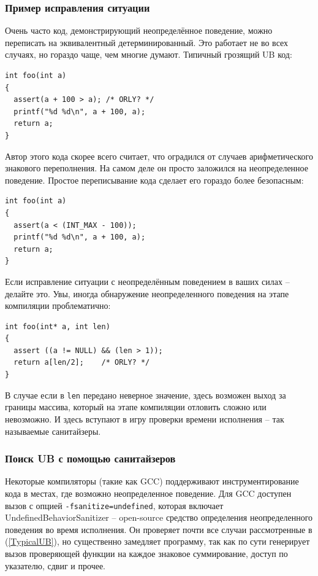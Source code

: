 \documentclass[a4paper,12pt,oneside]{article}
\begin{document}
\subsubsection{Пример исправления ситуации}\label{CorrectingUB}

Очень часто код, демонстрирующий неопределённое поведение, можно переписать на эквивалентный детерминированный. Это работает не во всех случаях, но гораздо чаще, чем многие думают. Типичный грозящий UB код:

\begin{lstlisting}
int foo(int a) 
{
  assert(a + 100 > a); /* ORLY? */
  printf("%d %d\n", a + 100, a);
  return a;
}
\end{lstlisting}

Автор этого кода скорее всего считает, что оградился от случаев арифметического знакового переполнения. На самом деле он просто заложился на неопределенное поведение. Простое переписывание кода сделает его гораздо более безопасным:

\begin{lstlisting}
int foo(int a) 
{
  assert(a < (INT_MAX - 100));
  printf("%d %d\n", a + 100, a);
  return a;
}
\end{lstlisting}

Если исправление ситуации с неопределённым поведением в ваших силах -- делайте это. Увы, иногда обнаружение неопределенного поведения на этапе компиляции проблематично:

\begin{lstlisting}
int foo(int* a, int len) 
{
  assert ((a != NULL) && (len > 1));
  return a[len/2];    /* ORLY? */
}
\end{lstlisting}

В случае если в \lstinline!len! передано неверное значение, здесь возможен выход за границы массива, который на этапе компиляции отловить сложно или невозможно. И здесь вступают в игру проверки времени исполнения -- так называемые санитайзеры.

\subsubsection{Поиск UB с помощью санитайзеров}\label{SanitizerUsage}

Некоторые компиляторы (такие как GCC) поддерживают инструментирование кода в местах, где возможно неопределенное поведение. Для GCC доступен вызов с опцией \lstinline!-fsanitize=undefined!, которая включает UndefinedBehaviorSanitizer -- open-source средство определения неопределенного поведения во время исполнения. Он проверяет почти все случаи рассмотренные в (\ref{TypicalUB}), но существенно замедляет программу, так как по сути генерирует вызов проверяющей функции на каждое знаковое суммирование, доступ по указателю, сдвиг и прочее.
\end{document}
